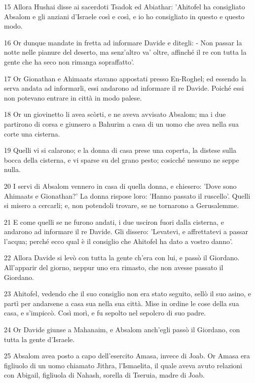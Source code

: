 \par 15 Allora Hushai disse ai sacerdoti Tsadok ed Abiathar: 'Ahitofel ha consigliato Absalom e gli anziani d'Israele così e così, e io ho consigliato in questo e questo modo.
\par 16 Or dunque mandate in fretta ad informare Davide e ditegli: - Non passar la notte nelle pianure del deserto, ma senz'altro va' oltre, affinché il re con tutta la gente che ha seco non rimanga sopraffatto'.
\par 17 Or Gionathan e Ahimaats stavano appostati presso En-Roghel; ed essendo la serva andata ad informarli, essi andarono ad informare il re Davide. Poiché essi non potevano entrare in città in modo palese.
\par 18 Or un giovinetto li avea scòrti, e ne aveva avvisato Absalom; ma i due partirono di corsa e giunsero a Bahurim a casa di un uomo che avea nella sua corte una cisterna.
\par 19 Quelli vi si calarono; e la donna di casa prese una coperta, la distese sulla bocca della cisterna, e vi sparse su del grano pesto; cosicché nessuno ne seppe nulla.
\par 20 I servi di Absalom vennero in casa di quella donna, e chiesero: 'Dove sono Ahimaats e Gionathan?' La donna rispose loro: 'Hanno passato il ruscello'. Quelli si misero a cercarli; e, non potendoli trovare, se ne tornarono a Gerusalemme.
\par 21 E come quelli se ne furono andati, i due usciron fuori dalla cisterna, e andarono ad informare il re Davide. Gli dissero: 'Levatevi, e affrettatevi a passar l'acqua; perché ecco qual è il consiglio che Ahitofel ha dato a vostro danno'.
\par 22 Allora Davide si levò con tutta la gente ch'era con lui, e passò il Giordano. All'apparir del giorno, neppur uno era rimasto, che non avesse passato il Giordano.
\par 23 Ahitofel, vedendo che il suo consiglio non era stato seguito, sellò il suo asino, e partì per andarsene a casa sua nella sua città. Mise in ordine le cose della sua casa, e s'impiccò. Così morì, e fu sepolto nel sepolcro di suo padre.
\par 24 Or Davide giunse a Mahanaim, e Absalom anch'egli passò il Giordano, con tutta la gente d'Israele.
\par 25 Absalom avea posto a capo dell'esercito Amasa, invece di Joab. Or Amasa era figliuolo di un uomo chiamato Jithra, l'Ismaelita, il quale aveva avuto relazioni con Abigail, figliuola di Nahash, sorella di Tseruia, madre di Joab.
